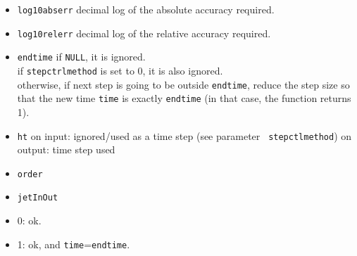 \documentclass[10pt]{article}
\theoremstyle{remark}
\begin{document}
\begin{itemize}
\item {\tt log10abserr}\newline
  decimal log of the absolute accuracy required.
\item {\tt log10relerr}\newline
  decimal log of the relative accuracy required.
\item {\tt endtime}\newline
  if {\tt NULL}, it is ignored. \\if {\tt stepctrlmethod} is set to
  0, it is also ignored. \\otherwise, if next step is going to be
  outside {\tt endtime}, reduce the step size so that the new time
  {\tt time} is exactly {\tt endtime} (in that case, the function
  returns 1).
\item {\tt ht}\newline
  on input: ignored/used as a time step (see parameter {\tt
  stepctlmethod})\newline
  on output: time step used
\item {\tt order}
\item {\tt jetInOut}
\end{itemize}

\begin{itemize}
\item 0: ok.
\item 1: ok, and {\tt time}={\tt endtime}.
\end{itemize}
\end{document}
